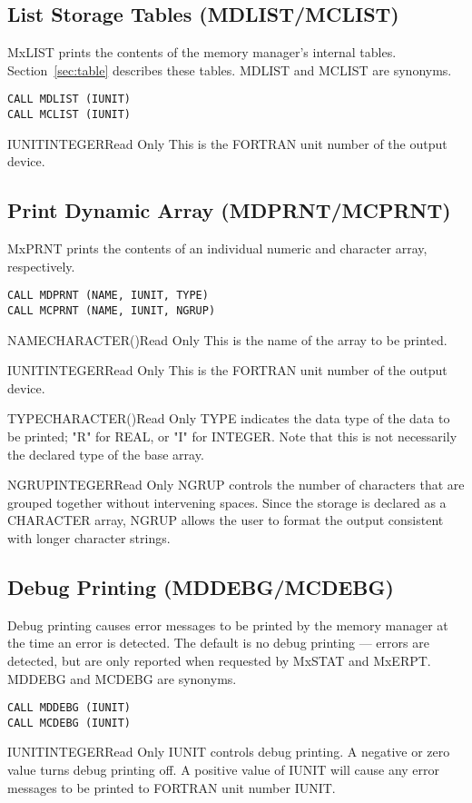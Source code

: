 \subsection{List Storage Tables (MDLIST/MCLIST)}
MxLIST prints the contents of the memory manager's internal
tables. Section~\ref{sec:table} describes these tables. MDLIST and MCLIST
are synonyms.
\begin{verbatim}
CALL MDLIST (IUNIT)
CALL MCLIST (IUNIT)
\end{verbatim}

\begin{argy}{IUNIT}{INTEGER}{Read Only}
This is the FORTRAN unit number of the output device.
\end{argy}

\subsection{Print Dynamic Array (MDPRNT/MCPRNT)}
MxPRNT prints the contents of an individual numeric and
character array, respectively.
\begin{verbatim}
CALL MDPRNT (NAME, IUNIT, TYPE)
CALL MCPRNT (NAME, IUNIT, NGRUP)
\end{verbatim}

\begin{argy}{NAME}{CHARACTER\last(\last)}{Read Only}
This is the name of the array to be printed.
\end{argy}

\begin{argy}{IUNIT}{INTEGER}{Read Only}
This is the FORTRAN unit number of the output device.
\end{argy}

\begin{argy}{TYPE}{CHARACTER\last(\last)}{Read Only}
TYPE indicates the data type of the data to be printed; "R" for REAL, or
"I" for INTEGER.  Note that this is not necessarily the declared type of the
base array.
\end{argy}

\begin{argy}{NGRUP}{INTEGER}{Read Only}
NGRUP controls the number of characters that are grouped together without
intervening spaces. Since the storage is declared as a CHARACTER
array, NGRUP allows the user to format the output consistent with longer
character strings.
\end{argy}

\subsection{Debug Printing (MDDEBG/MCDEBG)}
Debug printing causes error messages to be printed by the memory manager at
the time an error is detected. The default is no debug printing --- errors
are detected, but are only reported when re\-quest\-ed by MxSTAT and
MxERPT. MDDEBG and MCDEBG are synonyms.
\begin{verbatim}
CALL MDDEBG (IUNIT)
CALL MCDEBG (IUNIT)
\end{verbatim}

\begin{argy}{IUNIT}{INTEGER}{Read Only}
IUNIT controls debug printing. A negative or zero value
turns debug printing off. A positive value of IUNIT will cause any error
messages to be printed to FORTRAN unit number IUNIT.
\end{argy}
